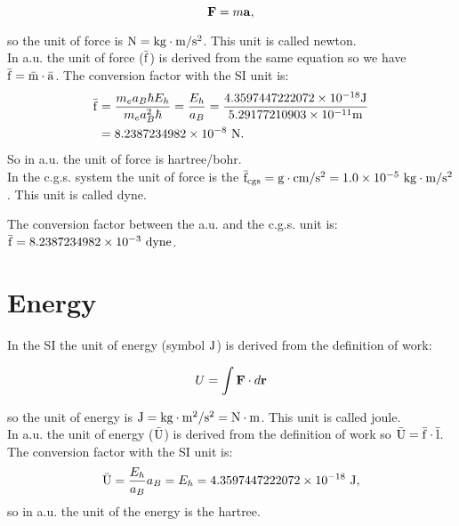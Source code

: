 \documentclass[12pt,a4paper,twoside]{report}
\def\barl{5.29177210903\times 10^{-11}}
\def\barf{8.2387234982\times 10^{-8}}
\def\baru{4.3597447222072\times 10^{-18}}
\def\ftof{1.0\times 10^{-5}}
\def\barfcgs{8.2387234982\times 10^{-3}}
\begin{document}
\begin{tcolorbox}
\begin{equation}
{\bf F}= m {\bf a},
\end{equation} 
\end{tcolorbox}

so the unit of force is ${\rm N}={\rm kg}\cdot {\rm m}/{\rm s}^2$. 
This unit is called newton.
\\

{\color{web-blue} In a.u. the unit of force (${\rm \bar f}$) is derived 
from the same equation so we have ${\rm \bar f} ={\rm \bar m} \cdot {\rm \bar a}$. The
conversion factor with the SI unit is: 
\begin{align}
{\rm \bar f} &= {m_e a_B \hbar E_h \over m_e a_B^2 \hbar }= 
{E_h\over a_B}\nonumber={\baru {\rm J} \over \barl {\rm m}}\nonumber \\
&=\barf\ {\rm N}. 
\end{align}
So in a.u. the unit of force is hartree/bohr.
}
\\

{\color{orange} In the c.g.s. system the unit of force is the 
${\rm \bar f_{cgs}}={\rm g}\cdot {\rm cm}/{\rm s}^2 = \ftof\ {\rm kg}\cdot {\rm m}/{\rm s}^2$. This unit is 
called dyne.
\\
}

{\color{green} The conversion factor between the a.u. and the c.g.s. unit is:
${\rm \bar f}=\barfcgs\ {\rm dyne}$.
\\
}
\newpage

{\color{coral}\section{Energy}}
\color{black}
In the SI the unit of energy (symbol ${\rm J}$) is derived from the 
definition of work: 

\begin{tcolorbox}
\begin{equation}
U= \int {\bf F} \cdot d{\bf r}
\end{equation} 
\end{tcolorbox}

so the unit of energy is ${\rm J}={\rm kg}\cdot {\rm m}^2/{\rm s}^2={\rm N}\cdot {\rm m}$. This unit is 
called joule.
\\

{\color{web-blue} In a.u. the unit of energy (${\rm \bar U}$) is derived 
from the definition of work so ${\rm \bar U} ={\rm \bar f} \cdot {\rm \bar l}$. The 
conversion factor with the SI unit is: 
\begin{equation}
{\rm \bar U} = {E_h\over a_B} a_B=E_h=\baru\ {\rm J}, 
\end{equation}
so in a.u. the unit of the energy is the hartree.
}
\\
\end{document}
